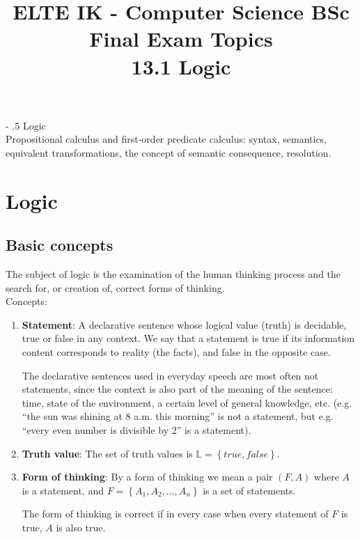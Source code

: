 \documentclass[margin=0px]{article}
\title{\textbf{{\Large ELTE IK - Computer Science BSc} \vspace{0.2cm} \\ {\huge Final Exam Topics}} \vspace{0.3cm} \\ 13.1 Logic}
\author{}
\date{}
\makeatletter
\renewcommand\paragraph{%
	\@startsection{paragraph}{4}{0mm}%
	{-\baselineskip}%
	{.5\baselineskip}%
	{\normalfont\normalsize\bfseries}}
\newenvironment{tetel}[1]{\paragraph{#1 \\}}{}
\makeatother
\begin{document}
\maketitle

\begin{center}
\end{center}

\begin{tetel}{Logic}
    Propositional calculus and first-order predicate calculus: syntax, semantics, equivalent transformations, the concept of semantic consequence, resolution.
\end{tetel}

\section{Logic}

\subsection{Basic concepts}

The subject of logic is the examination of the human thinking process and
the search for, or creation of, correct forms of thinking.\\

\noindent Concepts:
\begin{enumerate}
    \item	\textbf{Statement}: A declarative sentence whose logical value (truth) is
          decidable, true or false in any context. We say
          that a statement is true if its information content corresponds to reality (the facts),
          and false in the opposite case.

          The declarative sentences used in everyday speech are most often not statements, since
          the context is also part of the meaning of the sentence: time, state of the environment, a certain level
          of general knowledge, etc. (e.g. ``the sun was shining at 8 a.m. this morning'' is not a statement, but e.g.
          ``every even number is divisible by 2'' is a statement).

    \item	\textbf{Truth value}: The set of truth values is $\mathbb{L}=\left\{true,false\right\}$.

    \item	\textbf{Form of thinking}: By a form of thinking we mean a pair $(F,A)$ where
          $A$ is a statement, and $F=\left\{A_{1},A_{2},...,A_{n}\right\}$ is a set of statements.

          The form of thinking is correct if in every case when every statement of $F$ is
          true, $A$ is also true.
\end{enumerate}
\end{document}
